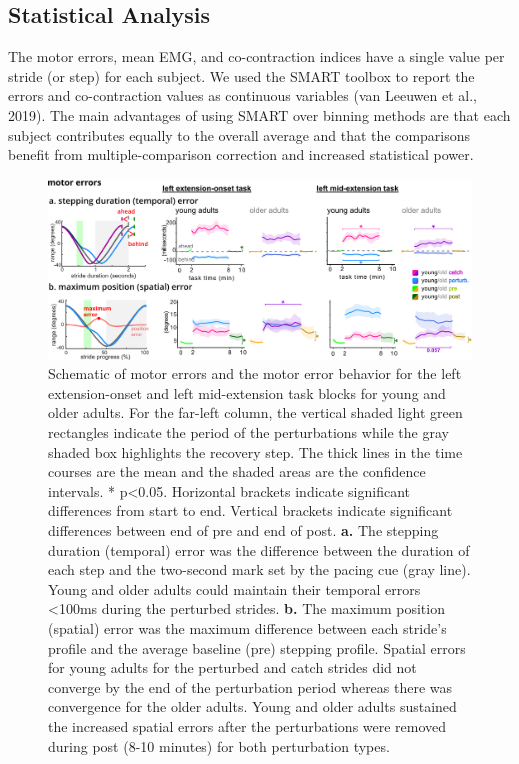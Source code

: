 \documentclass[../thesis_seyed.tex]{subfiles}
\begin{document}
\subsection{Statistical Analysis}
The motor errors, mean EMG, and co-contraction indices have a single value per stride (or step) for each subject. We used the SMART toolbox to report the errors and co-contraction values as continuous variables (van Leeuwen et al., 2019). The main advantages of using SMART over binning methods are that each subject contributes equally to the overall average and that the comparisons benefit from multiple-comparison correction and increased statistical power.
\begin{figure}[bt]
    \centering
    \includegraphics[width=\linewidth]{../img/02_error-metrics.jpg}
    \caption{Schematic of motor errors and the motor error behavior for the left extension-onset and left mid-extension task blocks for young and older adults. For the far-left column, the vertical shaded light green rectangles indicate the period of the perturbations while the gray shaded box highlights the recovery step. The thick lines in the time courses are the mean and the shaded areas are the confidence intervals. * p<0.05. Horizontal brackets indicate significant differences from start to end. Vertical brackets indicate significant differences between end of pre and end of post. \textbf{a.} The stepping duration (temporal) error was the difference between the duration of each step and the two-second mark set by the pacing cue (gray line). Young and older adults could maintain their temporal errors <100ms during the perturbed strides. \textbf{b.} The maximum position (spatial) error was the maximum difference between each stride’s profile and the average baseline (pre) stepping profile. Spatial errors for young adults for the perturbed and catch strides did not converge by the end of the perturbation period whereas there was convergence for the older adults. Young and older adults sustained the increased spatial errors after the perturbations were removed during post (8-10 minutes) for both perturbation types.}
    \label{fig:errorm}
\end{figure}
\end{document}
